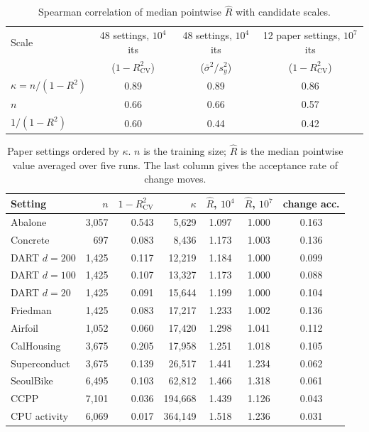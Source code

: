 \documentclass[11pt]{article}
\newcommand{\Rhat}{\hat R}
\begin{document}
\begin{table}[h]
\centering
\caption{Spearman correlation of median pointwise $\Rhat$ with candidate scales.}
\label{tab:spearman}
\begin{tabular}{lccc}
\toprule
Scale & 48 settings, $10^4$ its & 48 settings, $10^4$ its & 12 paper settings, $10^7$ its \\
 & ($1-R^2_{\mathrm{CV}}$) & ($\bar\sigma^2/s_y^2$) & ($1-R^2_{\mathrm{CV}}$) \\
\midrule
$\kappa=n/(1-R^2)$ & 0.89 & 0.89 & 0.86 \\
$n$ & 0.66 & 0.66 & 0.57 \\
$1/(1-R^2)$ & 0.60 & 0.44 & 0.42 \\
\bottomrule
\end{tabular}
\end{table}

\begin{table}[h]
\centering
\caption{Paper settings ordered by $\kappa$. $n$ is the training size; $\Rhat$ is the median pointwise value averaged over five runs. The last column gives the acceptance rate of change moves.}
\label{tab:paper}
\begin{tabular}{lrrrccc}
\toprule
Setting & $n$ & $1-R^2_{\mathrm{CV}}$ & $\kappa$ & $\Rhat$, $10^4$ & $\Rhat$, $10^7$ & change acc. \\
\midrule
Abalone & 3{,}057 & 0.543 & 5{,}629 & 1.097 & 1.000 & 0.163 \\
Concrete & 697 & 0.083 & 8{,}436 & 1.173 & 1.003 & 0.136 \\
DART $d{=}200$ & 1{,}425 & 0.117 & 12{,}219 & 1.184 & 1.000 & 0.099 \\
DART $d{=}100$ & 1{,}425 & 0.107 & 13{,}327 & 1.173 & 1.000 & 0.088 \\
DART $d{=}20$ & 1{,}425 & 0.091 & 15{,}644 & 1.199 & 1.000 & 0.104 \\
Friedman & 1{,}425 & 0.083 & 17{,}217 & 1.233 & 1.002 & 0.136 \\
Airfoil & 1{,}052 & 0.060 & 17{,}420 & 1.298 & 1.041 & 0.112 \\
CalHousing & 3{,}675 & 0.205 & 17{,}958 & 1.251 & 1.018 & 0.105 \\
Superconduct & 3{,}675 & 0.139 & 26{,}517 & 1.441 & 1.234 & 0.062 \\
SeoulBike & 6{,}495 & 0.103 & 62{,}812 & 1.466 & 1.318 & 0.061 \\
CCPP & 7{,}101 & 0.036 & 194{,}668 & 1.439 & 1.126 & 0.043 \\
CPU activity & 6{,}069 & 0.017 & 364{,}149 & 1.518 & 1.236 & 0.031 \\
\bottomrule
\end{tabular}
\end{table}
\end{document}
